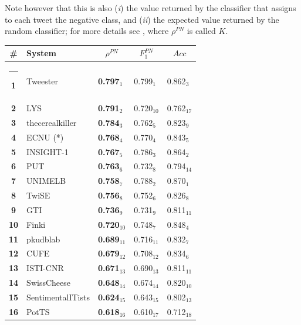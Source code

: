 \documentclass[11pt,letterpaper]{article}
\begin{document}
Note however that this is also (\emph{i}) the value returned by the
classifier that assigns to each tweet the negative class, and
(\emph{ii}) the expected value returned by the random classifier; for
more details see \cite[Section 5]{Sebastiani:2015zl}, where
$\rho^{PN}$ is called $K$.

\renewcommand{\baselinestretch}{0.78}
\begin{table}[htb]
  \centering
  \begin{small}
    \renewcommand{\arraystretch}{1.0}%
    \resizebox{\columnwidth}{!} {
    \begin{tabular}{|c|l|l|l|l|}
      \hline\rule[0ex]{0mm}{2ex} 
      \bf \# & \bf System & \multicolumn{1}{c|}{$\rho^{PN}$} & \multicolumn{1}{c|}{$F_{1}^{PN}$} & \multicolumn{1}{c|}{$Acc$} \\
      \hline\rule[0ex]{-1mm}{2ex} 
      \bf 1 & Tweester & \bf 0.797$_{1}$ & 0.799$_{1}$ & 0.862$_{3}$ \\
      \bf 2 & LYS & \bf 0.791$_{2}$ & 0.720$_{10}$ & 0.762$_{17}$ \\
      \bf 3 & thecerealkiller & \bf 0.784$_{3}$ & 0.762$_{5}$ & 0.823$_{9}$ \\
      \bf 4 & ECNU (*) & \bf 0.768$_{4}$ & 0.770$_{4}$ & 0.843$_{5}$ \\
      \bf 5 & INSIGHT-1 & \bf 0.767$_{5}$ & 0.786$_{3}$ & 0.864$_{2}$ \\
      \bf 6 & PUT & \bf 0.763$_{6}$ & 0.732$_{8}$ & 0.794$_{14}$ \\
      \bf 7 & UNIMELB & \bf 0.758$_{7}$ & 0.788$_{2}$ & 0.870$_{1}$ \\
      \bf 8 & TwiSE & \bf 0.756$_{8}$ & 0.752$_{6}$ & 0.826$_{8}$ \\
      \bf 9 & GTI & \bf 0.736$_{9}$ & 0.731$_{9}$ & 0.811$_{11}$ \\
      \bf 10 & Finki & \bf 0.720$_{10}$ & 0.748$_{7}$ & 0.848$_{4}$ \\
      \bf 11 & pkudblab & \bf 0.689$_{11}$ & 0.716$_{11}$ & 0.832$_{7}$ \\
      \bf 12 & CUFE & \bf 0.679$_{12}$ & 0.708$_{12}$ & 0.834$_{6}$ \\
      \bf 13 & ISTI-CNR & \bf 0.671$_{13}$ & 0.690$_{13}$ & 0.811$_{11}$ \\
      \bf 14 & SwissCheese & \bf 0.648$_{14}$ & 0.674$_{14}$ & 0.820$_{10}$ \\
      \bf 15 & SentimentalITists & \bf 0.624$_{15}$ & 0.643$_{15}$ & 0.802$_{13}$ \\
      \bf 16 & PotTS & \bf 0.618$_{16}$ & 0.610$_{17}$ & 0.712$_{18}$ \\

\end{tabular}}
\end{small}
\end{table}
\end{document}
